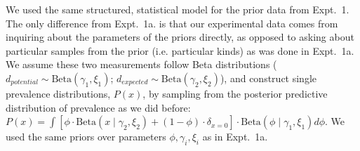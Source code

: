 \documentclass[12pt,letterpaper]{article}
\newcommand{\ndg}[1]{\textcolor{Green}{[ndg: #1]}}
\begin{document}
We used the same structured, statistical model for the prior data from Expt.~1.
The only difference from Expt.~1a. is that our experimental data comes from inquiring about the parameters of the priors directly, as opposed to asking about particular samples from the prior (i.e. particular kinds) as was done in Expt.~1a. 
We assume these two measurements follow Beta distributions ($d_{potential} \sim \text{Beta}(\gamma_{1}, \xi_{1})$; $
d_{expected} \sim \text{Beta}(\gamma_{2}, \xi_{2})$), and construct single prevalence distributions, $P(x)$, by sampling from the posterior predictive distribution of prevalence as we did before: $P(x) = \int [ \phi\cdot \text{Beta} (x \mid \gamma_{2}, \xi_{2}) + (1 -  \phi) \cdot \delta_{x=0} ] \cdot \text{Beta}(\phi \mid \gamma_{1}, \xi_{1}) d\phi$.
We used the same priors over parameters $\phi, \gamma_{i}, \xi_{i}$ as in Expt.~1a.
%
%
\end{document}
